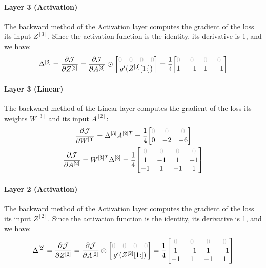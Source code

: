 \paragraph{Layer 3 (Activation)} The backward method of the Activation layer computes the gradient of the loss \wrt its input $Z^{[3]}$. Since the activation function is the identity, its derivative is 1, and we have:
\begin{equation*}
    \Delta^{[3]} = \pdv{\J}{Z^{[3]}} = \pdv{\J}{A^{[3]}} \odot \mqty[
        \mqty{\color{lightgray} 0 & \color{lightgray} 0 & \color{lightgray} 0 & \color{lightgray} 0} \\
        g'(Z^{[3]}[1\hspace{-0.6ex}:])
    ] = \frac{1}{4} \mqty[
        \color{lightgray} 0 & \color{lightgray} 0 & \color{lightgray} 0 & \color{lightgray} 0 \\
        1 & -1 & 1 & -1
    ]
\end{equation*}

\paragraph{Layer 3 (Linear)} The backward method of the Linear layer computes the gradient of the loss \wrt its weights $W^{[3]}$ and its input $A^{[2]}$:
\begin{gather*}
    \pdv{\J}{W^{[3]}} = \Delta^{[3]} A^{[2]T} = \frac{1}{4} \mqty[
        \color{lightgray} 0 & \color{lightgray} 0 & \color{lightgray} 0 \\
        0 & -2 & -6
    ]\\
    \pdv{\J}{A^{[2]}} = W^{[3]T} \Delta^{[3]} = \frac{1}{4} \mqty[
        \color{lightgray} 0 & \color{lightgray} 0 & \color{lightgray} 0 & \color{lightgray} 0 \\
        1 & -1 & 1 & -1 \\
        -1 & 1 & -1 & 1
    ]
\end{gather*}

\paragraph{Layer 2 (Activation)} The backward method of the Activation layer computes the gradient of the loss \wrt its input $Z^{[2]}$. Since the activation function is the identity, its derivative is 1, and we have:
\begin{equation*}
    \Delta^{[2]} = \pdv{\J}{Z^{[2]}} = \pdv{\J}{A^{[2]}} \odot \mqty[
        \mqty{\color{lightgray} 0 & \color{lightgray} 0 & \color{lightgray} 0 & \color{lightgray} 0} \\
        g'(Z^{[2]}[1\hspace{-0.6ex}:])
    ] = \frac{1}{4} \mqty[
        \color{lightgray} 0 & \color{lightgray} 0 & \color{lightgray} 0 & \color{lightgray} 0 \\
        1 & -1 & 1 & -1 \\
        -1 & 1 & -1 & 1
    ]
\end{equation*}

